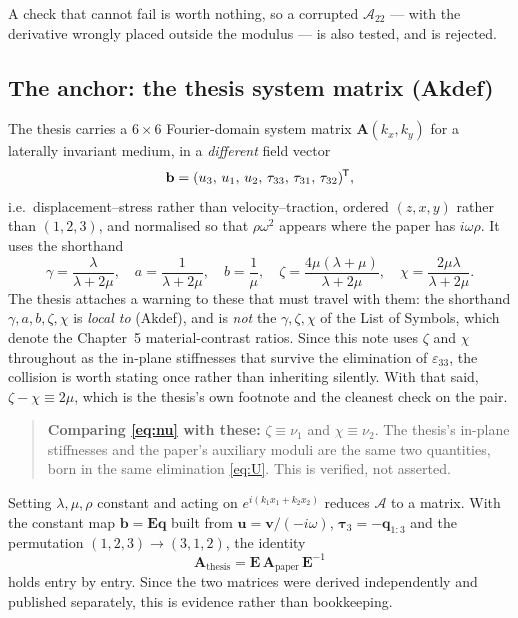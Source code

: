 \documentclass[11pt,a4paper]{article}
\newcommand{\bA}{\mathbf{A}}
\newcommand{\bq}{\mathbf{q}}
\newcommand{\bv}{\mathbf{v}}
\newcommand{\bu}{\mathbf{u}}
\newcommand{\bta}{\boldsymbol{\tau}}
\newcommand{\Aop}{\mathcal{A}}
\newcommand{\bE}{\mathbf{E}}
\newcommand{\tp}{^{\mkern-1.5mu\mathsf{T}}}
\begin{document}
A check that cannot fail is worth nothing, so a corrupted $\Aop_{22}$ --- with
the derivative wrongly placed outside the modulus --- is also tested, and is
rejected.

\subsection{The anchor: the thesis system matrix
\texorpdfstring{(Akdef)}{(Akdef)}}\label{sec:arbiterB}

The thesis carries a $6\times6$ Fourier-domain system matrix $\bA(k_x,k_y)$ for
a laterally invariant medium, in a \emph{different} field vector
\begin{equation}
  \mathbf{b} = (u_3,\,u_1,\,u_2,\,\tau_{33},\,\tau_{31},\,\tau_{32})\tp,
\end{equation}
i.e.\ displacement--stress rather than velocity--traction, ordered $(z,x,y)$
rather than $(1,2,3)$, and normalised so that $\rho\omega^2$ appears where the
paper has $i\omega\rho$.  It uses the shorthand
\begin{equation}
  \gamma = \frac{\lambda}{\lambda+2\mu},\quad
  a = \frac{1}{\lambda+2\mu},\quad
  b = \frac{1}{\mu},\quad
  \zeta = \frac{4\mu(\lambda+\mu)}{\lambda+2\mu},\quad
  \chi = \frac{2\mu\lambda}{\lambda+2\mu}.
\end{equation}
The thesis attaches a warning to these that must travel with them: the shorthand
$\gamma, a, b, \zeta, \chi$ is \emph{local to} (Akdef), and is \emph{not} the
$\gamma, \zeta, \chi$ of the List of Symbols, which denote the Chapter~5
material-contrast ratios.  Since this note uses $\zeta$ and $\chi$ throughout as
the in-plane stiffnesses that survive the elimination of $\varepsilon_{33}$, the
collision is worth stating once rather than inheriting silently.  With that
said, $\zeta - \chi \equiv 2\mu$, which is the thesis's own footnote and the
cleanest check on the pair.

\begin{quote}
\textbf{Comparing \eqref{eq:nu} with these:} $\zeta \equiv \nu_1$ and
$\chi \equiv \nu_2$.  The thesis's in-plane stiffnesses and the paper's
auxiliary moduli are the same two quantities, born in the same elimination
\eqref{eq:U}.  This is verified, not asserted.
\end{quote}

Setting $\lambda,\mu,\rho$ constant and acting on $e^{i(k_1x_1+k_2x_2)}$ reduces
$\Aop$ to a matrix.  With the constant map $\mathbf{b} = \bE\bq$ built from
$\bu = \bv/(-i\omega)$, $\bta_3 = -\bq_{1:3}$ and the permutation
$(1,2,3)\to(3,1,2)$, the identity
\begin{equation}\label{eq:similarity}
  \bA_{\text{thesis}} = \bE\,\bA_{\text{paper}}\,\bE^{-1}
\end{equation}
holds entry by entry.  Since the two matrices were derived independently and
published separately, this is evidence rather than bookkeeping.
\end{document}
